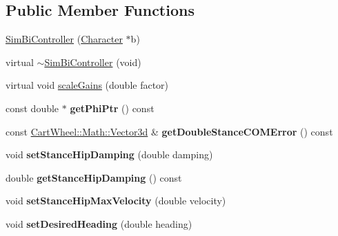\subsection*{Public Member Functions}
\begin{DoxyCompactItemize}
\item 
\hyperlink{classCartWheel_1_1Core_1_1SimBiController_a25e623cc1dff40619bee3baa5b48ceb5}{SimBiController} (\hyperlink{classCartWheel_1_1Core_1_1Character}{Character} $\ast$b)
\item 
virtual \hyperlink{classCartWheel_1_1Core_1_1SimBiController_a75f31006b3f9d1a66281c1121f8b6617}{$\sim$SimBiController} (void)
\item 
virtual void \hyperlink{classCartWheel_1_1Core_1_1SimBiController_a07bdc28113f2c5d77ecd3d4b144faa8d}{scaleGains} (double factor)
\item 
\hypertarget{classCartWheel_1_1Core_1_1SimBiController_ab922eca431d93b8a912f790668b8e807}{
const double $\ast$ {\bfseries getPhiPtr} () const }
\label{classCartWheel_1_1Core_1_1SimBiController_ab922eca431d93b8a912f790668b8e807}

\item 
\hypertarget{classCartWheel_1_1Core_1_1SimBiController_a6ad3b80b13f688bf5ecc16304860bbcc}{
const \hyperlink{classCartWheel_1_1Math_1_1Vector3d}{CartWheel::Math::Vector3d} \& {\bfseries getDoubleStanceCOMError} () const }
\label{classCartWheel_1_1Core_1_1SimBiController_a6ad3b80b13f688bf5ecc16304860bbcc}

\item 
\hypertarget{classCartWheel_1_1Core_1_1SimBiController_a14906ec79caebc535eafa4afc6c6fa31}{
void {\bfseries setStanceHipDamping} (double damping)}
\label{classCartWheel_1_1Core_1_1SimBiController_a14906ec79caebc535eafa4afc6c6fa31}

\item 
\hypertarget{classCartWheel_1_1Core_1_1SimBiController_ace40202dcc006d1d389fe93114833cb4}{
double {\bfseries getStanceHipDamping} () const }
\label{classCartWheel_1_1Core_1_1SimBiController_ace40202dcc006d1d389fe93114833cb4}

\item 
\hypertarget{classCartWheel_1_1Core_1_1SimBiController_aebb5ec6b1d49df0ed6d75d5f810e426b}{
void {\bfseries setStanceHipMaxVelocity} (double velocity)}
\label{classCartWheel_1_1Core_1_1SimBiController_aebb5ec6b1d49df0ed6d75d5f810e426b}

\item 
\hypertarget{classCartWheel_1_1Core_1_1SimBiController_ac9e0ca43a646bc78f68d1f764b1457bf}{
void {\bfseries setDesiredHeading} (double heading)}
\label{classCartWheel_1_1Core_1_1SimBiController_ac9e0ca43a646bc78f68d1f764b1457bf}


\end{DoxyCompactItemize}
